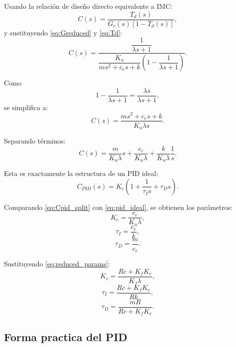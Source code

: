 \documentclass[11pt]{article}
\begin{document}
Usando la relaci\'on de dise\~no directo equivalente a IMC:
\begin{equation}
C(s)=\frac{T_d(s)}{G_r(s)\left[1-T_d(s)\right]},
\label{eq:ds}
\end{equation}
y sustituyendo \eqref{eq:Greduced} y \eqref{eq:Td}:
\begin{equation}
C(s)
=
\frac{\dfrac{1}{\lambda s+1}}
{\dfrac{K_u}{ms^2+c_e s+k}\left(1-\dfrac{1}{\lambda s+1}\right)}.
\end{equation}

Como
\[
1-\frac{1}{\lambda s+1}=\frac{\lambda s}{\lambda s+1},
\]
se simplifica a:
\begin{equation}
C(s)=\frac{ms^2+c_e s+k}{K_u\lambda s}.
\label{eq:Cpid_raw}
\end{equation}

Separando t\'erminos:
\begin{equation}
C(s)
=
\frac{m}{K_u\lambda}s
+
\frac{c_e}{K_u\lambda}
+
\frac{k}{K_u\lambda}\frac{1}{s}.
\label{eq:Cpid_split}
\end{equation}

Esta es exactamente la estructura de un PID ideal:
\begin{equation}
C_{PID}(s)=K_c\left(1+\frac{1}{\tau_I s}+\tau_D s\right).
\label{eq:pid_ideal}
\end{equation}

Comparando \eqref{eq:Cpid_split} con \eqref{eq:pid_ideal}, se obtienen los par\'ametros:
\begin{equation}
K_c = \frac{c_e}{K_u\lambda},
\label{eq:Kc1}
\end{equation}
\begin{equation}
\tau_I = \frac{c_e}{k},
\label{eq:Ti1}
\end{equation}
\begin{equation}
\tau_D = \frac{m}{c_e}.
\label{eq:Td1}
\end{equation}

Sustituyendo \eqref{eq:reduced_params}:
\begin{equation}
K_c = \frac{Rc+K_fK_e}{K_f\lambda},
\label{eq:Kc_final}
\end{equation}
\begin{equation}
\tau_I = \frac{Rc+K_fK_e}{Rk},
\label{eq:Ti_final}
\end{equation}
\begin{equation}
\tau_D = \frac{mR}{Rc+K_fK_e}.
\label{eq:Td_final}
\end{equation}

\subsection{Forma practica del PID}
\end{document}
